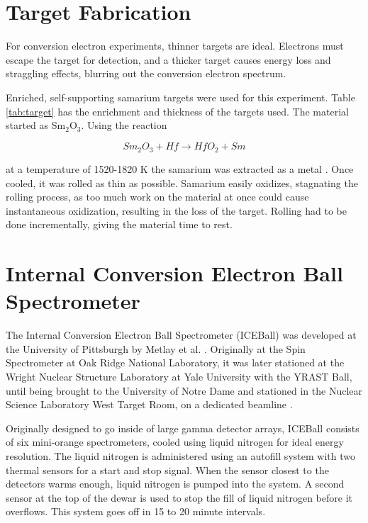 

\section{Target Fabrication}

For conversion electron experiments, thinner targets are ideal. Electrons must escape the target for detection, and a thicker target causes energy loss and straggling effects, blurring out the conversion electron spectrum.

Enriched, self-supporting samarium targets were used for this experiment. Table \ref{tab:target} has the enrichment and thickness of the targets used. The material started as Sm$_2$O$_3$. Using the reaction

\begin{equation}
    Sm_2O_3 + Hf \xrightarrow{} HfO_2 + Sm
    \label{eq:sm_hf}
\end{equation}

at a temperature of 1520-1820 K the samarium was extracted as a metal \citep{clifford02:_target}. Once cooled, it was rolled as thin as possible. Samarium easily oxidizes, stagnating the rolling process, as too much work on the material at once could cause instantaneous oxidization, resulting in the loss of the target. Rolling had to be done incrementally, giving the material time to rest.



\section{Internal Conversion Electron Ball Spectrometer}

The Internal Conversion Electron Ball Spectrometer (ICEBall) was developed at the University of Pittsburgh by Metlay et al. \citep{metlay92:_iceball_comm,metlay93:_iceball_comm}. Originally at the Spin Spectrometer at Oak Ridge National Laboratory, it was later stationed at the Wright Nuclear Structure Laboratory at Yale University with the YRAST Ball, until being brought to the University of Notre Dame and stationed in the Nuclear Science Laboratory West Target Room, on a dedicated beamline \citep{battaglia15:_iceball_176lu}.

Originally designed to go inside of large gamma detector arrays, ICEBall consists of six mini-orange spectrometers, cooled using liquid nitrogen for ideal energy resolution. The liquid nitrogen is administered using an autofill system with two thermal sensors for a start and stop signal. When the sensor closest to the detectors warms enough, liquid nitrogen is pumped into the system. A second sensor at the top of the dewar is used to stop the fill of liquid nitrogen before it overflows. This system goes off in 15 to 20 minute intervals.

